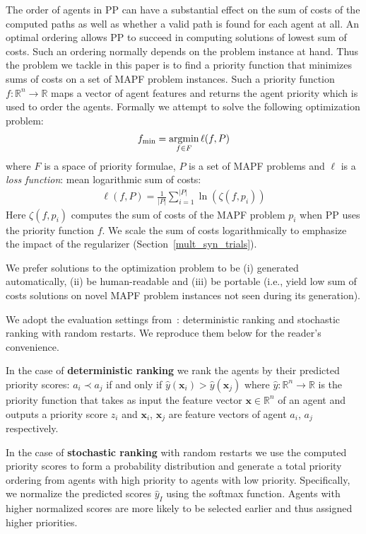 \documentclass[letterpaper]{article}
\newcommand{\bea}{\begin{eqnarray}}
\newcommand{\eea}{\end{eqnarray}}
\newcommand{\argmin}{\operatornamewithlimits{argmin}\limits}
\begin{document}
The order of agents in PP can have a substantial effect on the sum of costs of the computed paths as well as whether a valid path is found for each agent at all. An optimal ordering allows PP to succeed in computing solutions of lowest sum of costs. Such an ordering normally depends on the problem instance at hand. Thus the problem we tackle in this paper is to find a priority function that minimizes sums of costs on a set of MAPF problem instances. Such a  priority function $ f : \mathbb{R}^n \rightarrow \mathbb{R} $ maps a vector of agent features and returns the agent priority which is used to order the agents. Formally we attempt to solve the following optimization problem:
\bea
f_{\min} = \argmin_{f \in F} \ell(f, P)
\eea
where $ F $ is a space of priority formulae, $ P $ is a set of MAPF problems and $ \ell $ is a \textit{loss function}: mean logarithmic sum of costs:
\bea
\label{eq:loss}
{
\ell(f, P) = \frac{1}{|P|} \sum^{|P|}_{i = 1}\ln(\zeta(f, p_i))
}
\eea
Here $\zeta(f, p_i)$ computes the sum of costs of the MAPF problem $ p_i $ when PP uses the priority function $ f $. We scale the sum of costs logarithmically to emphasize the impact  of the regularizer (Section~\ref{mult_syn_trials}).

We prefer solutions to the optimization problem to be (i) generated automatically,  (ii) be human-readable and (iii) be portable (i.e., yield low sum of costs solutions on novel MAPF problem instances not seen during its generation).

We adopt the evaluation settings from~\citet{zhang2022learning}: deterministic ranking and stochastic ranking with random restarts. We reproduce them below for the reader's convenience.

In the case of \textbf{deterministic ranking} we rank the agents by their predicted priority scores: $ a_i \prec a_j $ if and only if $ \hat{y}(\mathbf{x}_i) > \hat{y}(\mathbf{x}_j) $ where $ \hat{y} : \mathbb{R}^n \rightarrow \mathbb{R} $ is the priority function that takes as input the feature vector $ \mathbf{x} \in \mathbb{R}^n $ of an agent and outputs a priority score $ z_i $ and $ \mathbf{x}_i $, $ \mathbf{x}_j $ are feature vectors of agent $ a_i $, $ a_j $ respectively.

In the case of \textbf{stochastic ranking} with random restarts we use the computed priority scores to form a probability distribution and generate a total priority ordering from agents with high priority to agents with low priority. Specifically, we normalize the predicted scores $ \hat{y}_I $ using the softmax function. Agents with higher normalized scores are more likely to be selected earlier and thus assigned higher priorities.
\end{document}
